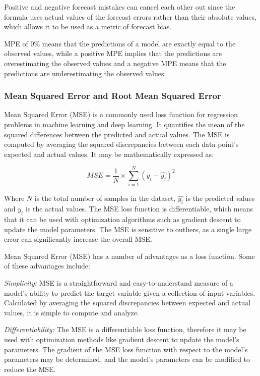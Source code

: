 \documentclass[a4paper]{article}
\begin{document}
Positive and negative forecast mistakes can cancel each other out since the formula uses actual values of the forecast errors rather than their absolute values, which allows it to be used as a metric of forecast bias.

MPE of 0\% means that the predictions of a model are exactly equal to the observed values, while a positive MPE implies that the predictions are overestimating the observed values and a negative MPE means that the predictions are underestimating the observed values.
\subsubsection{Mean Squared Error and Root Mean Squared Error} 
Mean Squared Error (MSE) is a commonly used loss function for regression problems in machine learning and deep learning. It quantifies the mean of the squared differences between the predicted and actual values. The MSE is computed by averaging the squared discrepancies between each data point's expected and actual values. It may be mathematically expressed as:

$$
MSE = \frac{1}{N} \times \sum_{i=1}^{N}(y_{i}-\hat{y_{i}})^2
$$

Where $N$ is the total number of samples in the dataset, $\hat{y_{i}}$ is the predicted values and $y_{i}$ is the actual values. The MSE loss function is differentiable, which means that it can be used with optimization algorithms such as gradient descent to update the model parameters. The MSE is sensitive to outliers, as a single large error can significantly increase the overall MSE.

Mean Squared Error (MSE) has a number of advantages as a loss function. Some of these advantages include:

\textit{Simplicity:} MSE is a straightforward and easy-to-understand measure of a model's ability to predict the target variable given a collection of input variables. Calculated by averaging the squared discrepancies between expected and actual values, it is simple to compute and analyze.

\textit{Differentiability:} The MSE is a differentiable loss function, therefore it may be used with optimization methods like gradient descent to update the model's parameters. The gradient of the MSE loss function with respect to the model's parameters may be determined, and the model's parameters can be modified to reduce the MSE.
\end{document}
